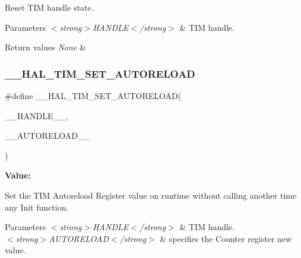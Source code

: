 Reset T\+IM handle state. 


\begin{DoxyParams}{Parameters}
{\em $<$strong$>$\+H\+A\+N\+D\+L\+E$<$/strong$>$} & T\+IM handle. \\
\hline
\end{DoxyParams}

\begin{DoxyRetVals}{Return values}
{\em None} & \\
\hline
\end{DoxyRetVals}
\mbox{\label{group___t_i_m___exported___macros_ga1e6300cab1e34ecaaf490dc7d4812d69}} 
\subsubsection{\texorpdfstring{\_\_HAL\_TIM\_SET\_AUTORELOAD}{\_\_HAL\_TIM\_SET\_AUTORELOAD}}
{\footnotesize\ttfamily \#define \+\_\+\+\_\+\+H\+A\+L\+\_\+\+T\+I\+M\+\_\+\+S\+E\+T\+\_\+\+A\+U\+T\+O\+R\+E\+L\+O\+AD(\begin{DoxyParamCaption}\item[{}]{\+\_\+\+\_\+\+H\+A\+N\+D\+L\+E\+\_\+\+\_\+,  }\item[{}]{\+\_\+\+\_\+\+A\+U\+T\+O\+R\+E\+L\+O\+A\+D\+\_\+\+\_\+ }\end{DoxyParamCaption})}

{\bfseries Value\+:}
\begin{DoxyCode}{0}
\DoxyCodeLine{\textcolor{keywordflow}{do}\{                                                    \(\backslash\)}

\end{DoxyCode}


Set the T\+IM Autoreload Register value on runtime without calling another time any Init function. 


\begin{DoxyParams}{Parameters}
{\em $<$strong$>$\+H\+A\+N\+D\+L\+E$<$/strong$>$} & T\+IM handle. \\
\hline
{\em $<$strong$>$\+A\+U\+T\+O\+R\+E\+L\+O\+A\+D$<$/strong$>$} & specifies the Counter register new value. \\
\hline
\end{DoxyParams}

